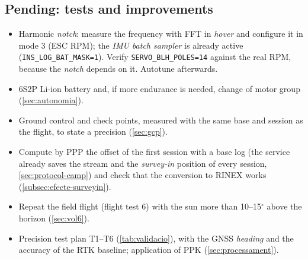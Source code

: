 \subsection{Pending: tests and improvements}
\begin{itemize}
    \item Harmonic \emph{notch}: measure the frequency with FFT in \emph{hover} and configure it in mode 3 (ESC RPM); the \emph{IMU batch sampler} is already active (\texttt{INS\_LOG\_BAT\_MASK=1}). Verify \texttt{SERVO\_BLH\_POLES=14} against the real RPM, because the \emph{notch} depends on it. Autotune afterwards.
    \item 6S2P Li-ion battery and, if more endurance is needed, change of motor group (\cref{sec:autonomia}).
    \item Ground control and check points, measured with the same base and session as the flight, to state a precision (\cref{sec:gcp}).
    \item Compute by PPP the offset of the first session with a base log (the service already saves the stream and the \emph{survey-in} position of every session, \cref{sec:protocol-camp}) and check that the conversion to RINEX works (\cref{subsec:efecte-surveyin}).
    \item Repeat the field flight (flight test 6) with the sun more than 10--15$^{\circ}$ above the horizon (\cref{sec:vol6}).
    \item Precision test plan T1--T6 (\cref{tab:validacio}), with the GNSS \emph{heading} and the accuracy of the RTK baseline; application of PPK (\cref{sec:processament}).
\end{itemize}
